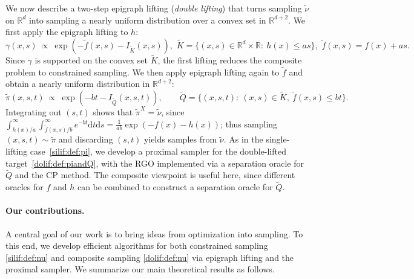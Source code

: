 \documentclass[11pt,letterpaper]{article}
\newcommand{\R}{\mathbb{R}}
\newcommand{\K}{\widetilde{K}}
\newcommand{\Q}{\widetilde{Q}}
\newcommand{\D}{\mathrm{d}}
\begin{document}
We now describe a two-step epigraph lifting (\emph{double lifting}) that turns sampling $\tilde{\nu}$ on $\R^d$ into sampling a nearly uniform
distribution over a convex set in $\R^{d+2}$.
We first apply the epigraph lifting to $h$:
\begin{equation}
\label{dolif:def:gammaandK}
\gamma(x,s)\ \propto\ \exp \left(-\tilde f(x,s)-I_{\K}(x,s)\right),
\,\,
\K=\{(x,s) \in \R^d \times \R:\ h(x)\le a s\}, \,\, \tilde f(x,s)=f(x)+as.
\end{equation}
Since $\gamma$ is supported on the convex set $\K$, the first lifting reduces the composite problem to constrained sampling. We then apply epigraph lifting again to $\tilde{f}$ and obtain a nearly uniform distribution in $\R^{d+2}$:
\begin{equation}
\label{dolif:def:piandQ}
\tilde{\pi}(x,s,t)\ \propto\ \exp \left(-bt-I_{\Q}(x,s,t)\right),
\qquad
\Q=\{(x,s,t):\ (x,s)\in\K,\ \tilde f(x,s)\le bt\}.
\end{equation}
Integrating out $(s,t)$ shows that $\tilde{\pi}^X=\tilde{\nu}$, since $\int_{h(x)/a}^{\infty}\int_{\tilde f(x,s)/b}^{\infty} e^{-bt} \D t \D s=\frac{1}{ab}\exp\!\left(-f(x)-h(x)\right)$; thus sampling $(x,s,t)\sim\tilde{\pi}$ and discarding $(s,t)$ yields samples from $\tilde{\nu}$. As in the single-lifting case~\eqref{silif:def:pi}, we develop a proximal sampler for the double-lifted target~\eqref{dolif:def:piandQ}, with the RGO implemented via a separation oracle for $\Q$ and the CP method. The composite viewpoint is useful here, since different oracles for $f$ and $h$ can be combined to construct a separation oracle for $\Q$.


\paragraph*{Our contributions.}
A central goal of our work is to bring ideas from optimization into sampling. To this end, we develop efficient algorithms for both  constrained sampling \eqref{silif:def:nu} and composite sampling \eqref{dolif:def:nu} via epigraph lifting and the proximal sampler. We summarize our main theoretical results as follows.
\end{document}
